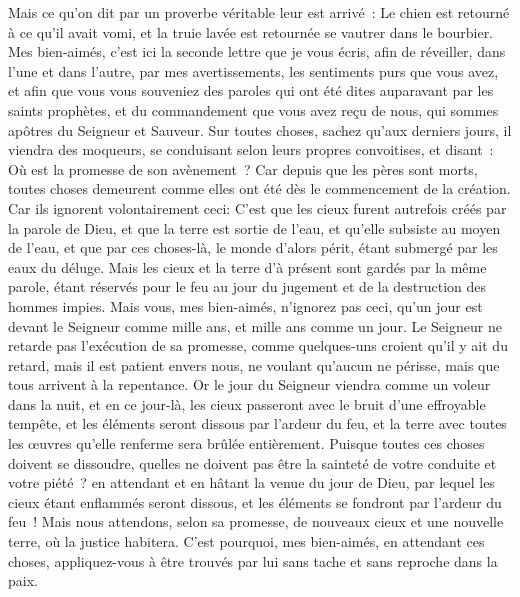 \begin{multicols}{2}
Mais ce qu'on dit par un proverbe véritable leur est arrivé~: Le chien est retourné à ce qu'il avait vomi, et la truie lavée est retournée se vautrer dans le bourbier.
\VerseOne{}Mes bien-aimés, c'est ici la seconde lettre que je vous écris, afin de réveiller, dans l'une et dans l'autre, par mes avertissements, les sentiments purs que vous avez,
et afin que vous vous souveniez des paroles qui ont été dites auparavant par les saints prophètes, et du commandement que vous avez reçu de nous, qui sommes apôtres du Seigneur et Sauveur.
Sur toutes choses, sachez qu'aux derniers jours, il viendra des moqueurs, se conduisant selon leurs propres convoitises,
et disant~: Où est la promesse de son avènement~? Car depuis que les pères sont morts, toutes choses demeurent comme elles ont été dès le commencement de la création.
Car ils ignorent volontairement ceci: C'est que les cieux furent autrefois créés par la parole de Dieu, et que la terre est sortie de l'eau, et qu'elle subsiste au moyen de l'eau,
et que par ces choses-là, le monde d'alors périt, étant submergé par les eaux du déluge.
Mais les cieux et la terre d'à présent sont gardés par la même parole, étant réservés pour le feu au jour du jugement et de la destruction des hommes impies.
Mais vous, mes bien-aimés, n'ignorez pas ceci, qu'un jour est devant le Seigneur comme mille ans, et mille ans comme un jour.
Le Seigneur ne retarde pas l'exécution de sa promesse, comme quelques-uns croient qu'il y ait du retard, mais il est patient envers nous, ne voulant qu'aucun ne périsse, mais que tous arrivent à la repentance.
Or le jour du Seigneur viendra comme un voleur dans la nuit, et en ce jour-là, les cieux passeront avec le bruit d'une effroyable tempête, et les éléments seront dissous par l'ardeur du feu, et la terre avec toutes les œuvres qu'elle renferme sera brûlée entièrement.
Puisque toutes ces choses doivent se dissoudre, quelles ne doivent pas être la sainteté de votre conduite et votre piété~?
en attendant et en hâtant la venue du jour de Dieu, par lequel les cieux étant enflammés seront dissous, et les éléments se fondront par l'ardeur du feu~!
Mais nous attendons, selon sa promesse, de nouveaux cieux et une nouvelle terre, où la justice habitera.
C'est pourquoi, mes bien-aimés, en attendant ces choses, appliquez-vous à être trouvés par lui sans tache et sans reproche dans la paix.

\end{multicols}
